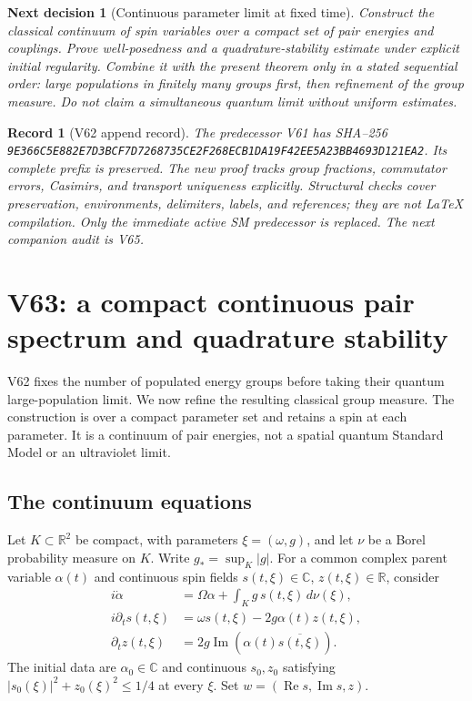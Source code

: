 \documentclass[11pt]{article}
\newtheorem{decision}[theorem]{Next decision}
\newtheorem{record}[theorem]{Record}
\theoremstyle{remark}
\begin{document}
\begin{decision}[Continuous parameter limit at fixed time]
\label{dec:v20v62-next}
Construct the classical continuum of spin variables
over a compact set of pair energies and couplings.
Prove well-posedness and a quadrature-stability estimate
under explicit initial regularity.  Combine it with
the present theorem only in a stated sequential order:
large populations in finitely many groups first, then
refinement of the group measure.  Do not claim a
simultaneous quantum limit without uniform estimates.
\end{decision}

\begin{record}[V62 append record]
\label{rec:v20v62}
The predecessor V61 has SHA--256
\texttt{9E366C5E882E7D3BCF7D7268735CE2F268ECB1DA19F42EE5A23BB4693D121EA2}.
Its complete prefix is preserved.  The new proof
tracks group fractions, commutator errors, Casimirs,
and transport uniqueness explicitly.  Structural
checks cover preservation, environments, delimiters,
labels, and references; they are not LaTeX compilation.
Only the immediate active SM predecessor is replaced.
The next companion audit is V65.
\end{record}


\section{V63: a compact continuous pair spectrum and quadrature stability}
\label{sec:v20v63}

V62 fixes the number of populated energy groups before taking
their quantum large-population limit.  We now refine the
resulting classical group measure.  The construction is over
a compact parameter set and retains a spin at each parameter.
It is a continuum of pair energies, not a spatial quantum
Standard Model or an ultraviolet limit.

\subsection{The continuum equations}

Let \(K\subset\mathbb R^2\) be compact, with parameters
\(\xi=(\omega,g)\), and let \(\nu\) be a Borel probability
measure on \(K\).  Write \(g_*=\sup_K|g|\).
For a common complex parent variable \(\alpha(t)\) and
continuous spin fields \(s(t,\xi)\in\mathbb C\),
\(z(t,\xi)\in\mathbb R\), consider
\[
 \begin{aligned}
 i\dot\alpha&=\Omega\alpha+\int_K g\,s(t,\xi)\,d\nu(\xi),\\
 i\partial_t s(t,\xi)&=\omega s(t,\xi)-2g\alpha(t)z(t,\xi),\\
 \partial_t z(t,\xi)&=2g\operatorname{Im}
                                   (\alpha(t)\overline{s(t,\xi)}).
 \end{aligned}
\]
The initial data are \(\alpha_0\in\mathbb C\) and continuous
\(s_0,z_0\) satisfying \(|s_0(\xi)|^2+z_0(\xi)^2\leq1/4\)
at every \(\xi\).  Set \(w=(\operatorname{Re}s,\operatorname{Im}s,z)\).
\end{document}
